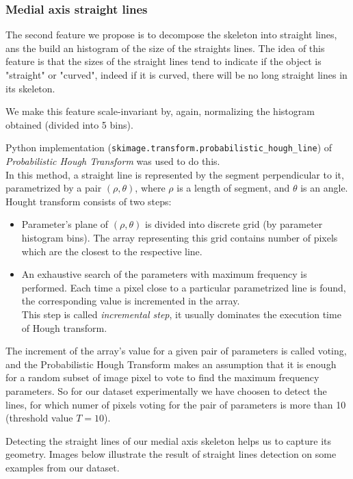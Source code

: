 \documentclass[12pt]{article}
\begin{document}
\subsubsection{Medial axis straight lines}
The second feature we propose is to decompose the skeleton into straight lines, ans the build an histogram of the size of the straights lines.
The idea of this feature is that the sizes of the straight lines tend to indicate if the object is "straight" or "curved", indeed if it is curved, there will be no long straight lines in its skeleton.

We make this feature scale-invariant by, again, normalizing the histogram obtained (divided into 5 bins).

Python implementation (\texttt{skimage.transform.probabilistic\_hough\_line}) of \textit{Probabilistic Hough Transform} \cite{Kiryati} was used to do this. \\
In this method, a straight line is represented by the segment perpendicular to it, parametrized by a pair $(\rho, \theta)$, where $\rho$ is a length of segment, and $\theta$ is an angle. \\
Hought transform consists of two steps: 
\begin{itemize}
  \item Parameter's plane of $(\rho, \theta)$ is divided into discrete grid (by parameter histogram bins). The array representing this grid contains number of pixels which are the closest to the respective line.
  \item An exhaustive search of the parameters with maximum frequency is performed. Each time a pixel close to a particular parametrized line is found, the corresponding value is incremented in the array.\\
  This step is called \textit{incremental step}, it usually dominates the execution time of Hough transform.
\end{itemize}

The increment of the array's value for a given pair of parameters is called voting, and the Probabilistic Hough Transform makes an assumption that it is enough for a random subset of image pixel to vote to find the maximum frequency parameters. So for our dataset experimentally we have choosen to detect the lines, for which numer of pixels voting for the pair of parameters is more than 10 (threshold value $T=10$).

Detecting the straight lines of our medial axis skeleton helps us to capture its geometry. Images below illustrate the result of straight lines detection on some examples from our dataset.
\end{document}
